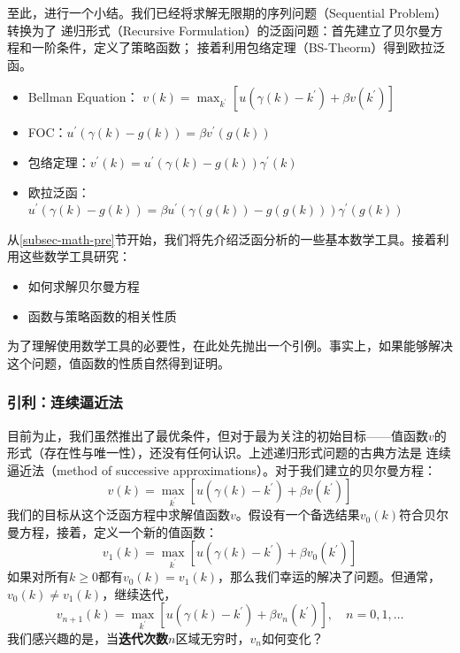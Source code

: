 至此，进行一个小结。我们已经将求解无限期的序列问题（Sequential Problem）转换为了
递归形式（Recursive Formulation）的泛函问题：首先建立了贝尔曼方程和一阶条件，定义了策略函数；
接着利用包络定理（BS-Theorm）得到欧拉泛函。
\begin{itemize}
    \item Bellman Equation：
    $v\left(k\right) = \max _{k^{\prime}}\left[u\left(\gamma\left(k\right)-k^{\prime}\right)+\beta v\left(k^{\prime}\right)\right]$
    \item FOC：$u^{\prime}\left(\gamma\left(k\right)-g\left(k\right)\right) = \beta v^{\prime}\left(g\left(k\right)\right)$
    \item 包络定理：$v^{\prime}\left(k\right) = u^{\prime}\left(\gamma\left(k\right)-g\left(k\right)\right)\gamma^{\prime}\left(k\right)$
    \item 欧拉泛函：$u^{\prime}\left(\gamma\left(k\right)-g\left(k\right)\right) 
        = \beta u^{\prime}\left(\gamma\left(g\left(k\right)\right)-g\left(g\left(k\right)\right)\right)
            \gamma^{\prime}\left(g\left(k\right)\right)$
\end{itemize}

从\ref{subsec-math-pre}节开始，我们将先介绍泛函分析的一些基本数学工具。接着利用这些数学工具研究：
\begin{itemize}
    \item 如何求解贝尔曼方程
    \item 函数与策略函数的相关性质
\end{itemize}

为了理解使用数学工具的必要性，在此处先抛出一个引例。事实上，如果能够解决这个问题，值函数的性质自然得到证明。


\subsubsection{引利：连续逼近法}

目前为止，我们虽然推出了最优条件，但对于最为关注的初始目标——值函数$v$的形式（存在性与唯一性），还没有任何认识。上述递归形式问题的古典方法是
连续逼近法（method of successive approximations）。对于我们建立的贝尔曼方程：
$$
v\left(k\right)=\max _{k^{\prime}}\left[u\left(\gamma\left(k\right)-k^{\prime}\right)+\beta v\left(k^{\prime}\right)\right]
$$
我们的目标从这个泛函方程中求解值函数$v$。假设有一个备选结果$v_0\left(k\right)$符合贝尔曼方程，接着，定义一个新的值函数：
$$
v_1\left(k\right) = \max _{k^{\prime}}\left[u\left(\gamma\left(k\right)-k^{\prime}\right)+\beta v_0\left(k^{\prime}\right)\right]
$$
如果对所有$k\geq 0$都有$v_0\left(k\right)=v_1\left(k\right)$，那么我们幸运的解决了问题。但通常，$v_0\left(k\right) \neq v_1\left(k\right)$，继续迭代，
$$
v_{n+1}\left(k\right) = \max _{k^{\prime}}\left[u\left(\gamma\left(k\right)-k^{\prime}\right)+\beta v_n\left(k^{\prime}\right)\right],
    \quad n = 0,1,\dots
$$
我们感兴趣的是，当\textbf{迭代次数}$n$区域无穷时，$v_n$如何变化？

